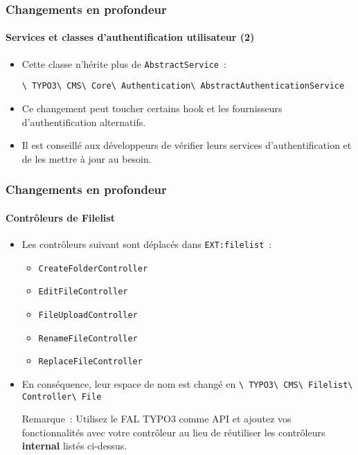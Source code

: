 \begin{frame}[fragile]
	\frametitle{Changements en profondeur}
	\framesubtitle{Services et classes d'authentification utilisateur (2)}

	\begin{itemize}

		\item Cette classe n'hérite plus de
			\smaller\texttt{AbstractService}~:\normalsize\hspace{0.1cm}

			\smaller\texttt{\textbackslash
				TYPO3\textbackslash
				CMS\textbackslash
				Core\textbackslash
				Authentication\textbackslash
				AbstractAuthenticationService}\normalsize

		\item Ce changement peut toucher certains hook et les fournisseurs d'authentification alternatifs.

		\item Il est conseillé aux développeurs de vérifier leurs services d'authentification et de les mettre
			à jour au besoin.

	\end{itemize}

\end{frame}


\begin{frame}[fragile]
	\frametitle{Changements en profondeur}
	\framesubtitle{Contrôleurs de Filelist}

	\begin{itemize}
		\item Les contrôleurs suivant sont déplacés dans \texttt{EXT:filelist}~:

			\begin{itemize}\small
				\item \texttt{CreateFolderController}
				\item \texttt{EditFileController}
				\item \texttt{FileUploadController}
				\item \texttt{RenameFileController}
				\item \texttt{ReplaceFileController}
			\end{itemize}\normalsize

		\item En conséquence, leur espace de nom est changé en\newline
			\texttt{\textbackslash
				TYPO3\textbackslash
				CMS\textbackslash
				Filelist\textbackslash
				Controller\textbackslash
				File}

		\vspace{0.2cm}

		\small
			Remarque~: Utilisez le FAL TYPO3 comme API et ajoutez vos fonctionnalités avec votre contrôleur
			au lieu de réutiliser les contrôleurs \textbf{internal} listés ci-dessus.
		\normalsize

	\end{itemize}

\end{frame}

